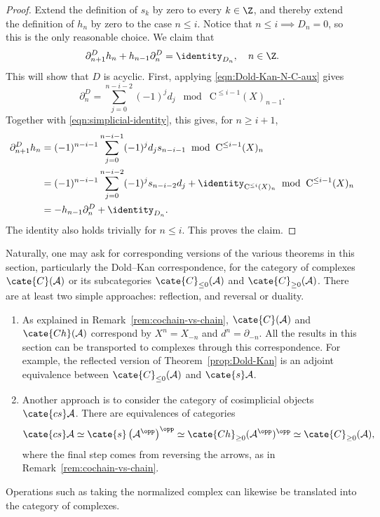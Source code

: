 \begin{proof}
	Extend the definition of $s_k$ by zero to every $k\in\Z$, and thereby
	extend the definition of $h_n$ by zero to the case $n\leq i$. Notice that
	$n\leq i\implies D_n=0$, so this is the only reasonable choice. We claim
	that
	\[ \partial^D_{n+1}h_n+h_{n-1}\partial^D_n=\identity_{D_n}, \quad n\in\Z. \]
	This will show that $D$ is acyclic. First, applying
	\eqref{eqn:Dold-Kan-N-C-aux} gives
	\[ \partial^D_n = \sum_{j=0}^{n-i-2} (-1)^j d_j \;\bmod\; \mathrm{C}^{\leq i-1}(X)_{n-1}. \]
	Together with \eqref{eqn:simplicial-identity}, this gives, for
	$n\geq i+1$,
	\begin{align*}
		\partial^D_{n+1} h_n & = (-1)^{n-i-1} \sum_{j=0}^{n-i-1} (-1)^j d_j s_{n-i-1} \; \bmod\; \mathrm{C}^{\leq i-1}(X)_n \\
		& = (-1)^{n-i-1} \sum_{j=0}^{n-i-2} (-1)^j s_{n-i-2} d_j + \identity_{\mathrm{C}^{\leq i}(X)_n} \; \bmod\; \mathrm{C}^{\leq i-1}(X)_n \\
		& = -h_{n-1} \partial^D_n + \identity_{D_n}.
	\end{align*}
	The identity also holds trivially for $n\leq i$. This proves the claim.
\end{proof}

\begin{remark}
	Naturally, one may ask for corresponding versions of the various theorems
	in this section, particularly the Dold--Kan correspondence, for the
	category of complexes $\cate{C}(\mathcal{A})$ or its subcategories
	$\cate{C}_{\leq0}(\mathcal{A})$ and
	$\cate{C}_{\geq0}(\mathcal{A})$. There are at least two simple
	approaches: reflection, and reversal or duality.
	\begin{enumerate}
		\item As explained in Remark~\ref{rem:cochain-vs-chain},
		$\cate{C}(\mathcal{A})$ and $\cate{Ch}(\mathcal{A})$ correspond by
		$X^n=X_{-n}$ and $d^n=\partial_{-n}$. All the results in this section
		can be transported to complexes through this correspondence. For
		example, the reflected version of Theorem~\ref{prop:Dold-Kan} is an
		adjoint equivalence between $\cate{C}_{\leq0}(\mathcal{A})$ and
		$\cate{s}\mathcal{A}$.
		\item Another approach is to consider the category of cosimplicial
		objects $\cate{cs}\mathcal{A}$. There are equivalences of categories
		\[ \cate{cs}\mathcal{A} \simeq \cate{s}\left(\mathcal{A}^{\opp}\right)^{\opp} \simeq \cate{Ch}_{\geq 0}(\mathcal{A}^{\opp})^{\opp} \simeq \cate{C}_{\geq 0}(\mathcal{A}), \]
		where the final step comes from reversing the arrows, as in
		Remark~\ref{rem:cochain-vs-chain}.
	\end{enumerate}
	Operations such as taking the normalized complex can likewise be
	translated into the category of complexes.
\end{remark}
